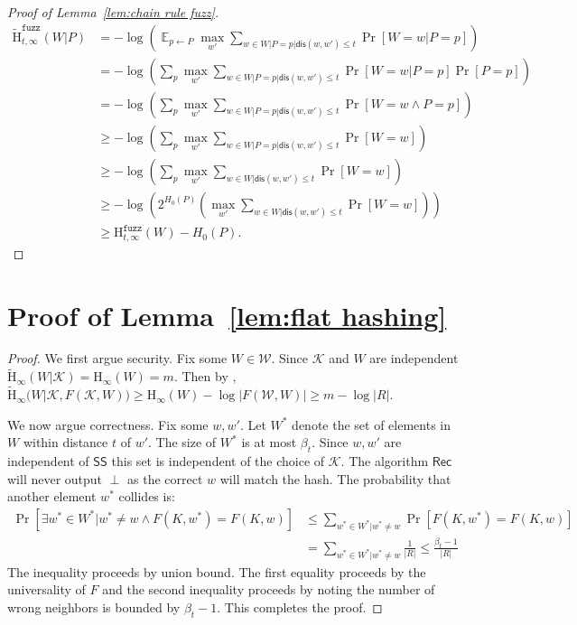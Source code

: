 \documentclass[11pt]{article}
\newcommand{\lemref}[1]{\mbox{Lemma~\ref{#1}}}
\DeclareMathOperator*{\expe}{\mathbb{E}}
\newcommand{\class}[1]{{\ensuremath{\mathsf{#1}}}}
\newcommand{\sketch}{\ensuremath{\class{SS}}\xspace}
\newcommand{\rec}{\ensuremath{\class{Rec}}\xspace}
\newcommand{\dis}{\ensuremath{\mathsf{dis}}}
\newcommand{\Hoo}{\mathrm{H}_\infty}
\newcommand{\Hav}{\tilde{\mathrm{H}}_\infty}
\newcommand{\Hfuzz}{\mathrm{H}^{\mathtt{fuzz}}_{t,\infty}}
\newcommand{\Hfav}{\tilde{\mathrm{H}}^{\mathtt{fuzz}}_{t,\infty}}
\begin{document}
\begin{proof}[Proof of \lemref{lem:chain rule fuzz}]
\begin{align*}
\Hfav(W|P) &= -\log \left( \expe_{p\leftarrow P} \max_{w'} \sum_{w\in W |P =p | \dis(w, w')\le t} \Pr[W=w|P=p] \right)\\
&= -\log \left( \sum_{p} \max_{w'} \sum_{w\in W |P =p | \dis(w, w')\le t} \Pr[W=w|P=p]\Pr[P=p] \right)\\
&= -\log \left( \sum_{p} \max_{w'} \sum_{w\in W |P =p | \dis(w, w')\le t} \Pr[W=w \wedge P=p] \right)\\
&\ge -\log \left( \sum_{p} \max_{w'} \sum_{w\in W |P =p | \dis(w, w')\le t} \Pr[W=w] \right)\\
&\ge -\log \left( \sum_{p} \max_{w'} \sum_{w\in W | \dis(w, w')\le t} \Pr[W=w] \right)\\
&\ge -\log \left( 2^{H_0(P)} \left(\max_{w'} \sum_{w\in W | \dis(w, w')\le t} \Pr[W=w] \right)\right)\\
&\ge \Hfuzz(W) - H_0(P).
\end{align*}
\end{proof}


\section{Proof of \lemref{lem:flat hashing}}
\label{sec:proof of flat hashing}
\begin{proof}
We first argue security.  Fix some $W\in\mathcal{W}$. Since $\mathcal{K}$ and $W$ are independent $\Hav(W | \mathcal{K}) = \Hoo(W) = m$.  Then by \cite[Lemma 2.2b]{DBLP:journals/siamcomp/DodisORS08}, $\Hav(W | \mathcal{K}, F(\mathcal{K}, W)) \ge \Hoo(W) - \log |F(\mathcal{W}, W)| \ge m - \log |R|$.

We now argue correctness.  Fix some $w, w'$.  Let $W^*$ denote the set of elements in $W$ within distance $t$ of $w'$.  The size of $W^*$ is at most $\beta_{t}$.  Since $w, w'$ are independent of $\sketch$ this set is independent of the choice of $\mathcal{K}$.  The algorithm  $\rec$ will never output $\perp$ as the correct $w$ will match the hash.  The probability that another element $w^*$ collides is:
\begin{align*}
\Pr[\exists w^* \in W^* |w^* \neq w \wedge F(K, w^*) = F(K, w)] &\le \sum_{w^*\in W^* | w^*\neq w} \Pr[F(K, w^*) = F(K, w)] \\
 &= \sum_{w^*\in W^* | w^*\neq w} \frac{1}{|R|} \le \frac{\beta_{t}-1}{|R|}
\end{align*}
The inequality proceeds by union bound. The first equality proceeds by the universality of $F$ and the second inequality proceeds by noting the number of wrong neighbors is bounded by $\beta_{t}-1$.  This completes the proof.
\end{proof}
\end{document}

